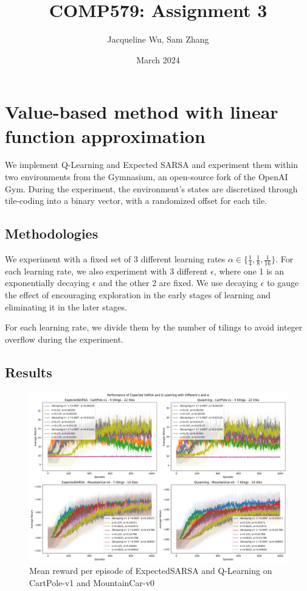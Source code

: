 \documentclass{article}
\title{COMP579: Assignment 3}
\author{Jacqueline Wu, Sam Zhang}
\date{March 2024}
\begin{document}
\maketitle

\section{Value-based method with linear function approximation}
We implement Q-Learning and Expected SARSA and experiment them within two environments from the Gymnasium, an open-source fork of the OpenAI Gym.\cite{gymnasium}
During the experiment, the environment's states are discretized through tile-coding into a binary vector, with a randomized offset for each tile.

\subsection{Methodologies}
We experiment with a fixed set of 3 different learning rates $\alpha \in \{ \frac{1}{4}, \frac{1}{8}, \frac{1}{16} \}$.
For each learning rate, we also experiment with 3 different $\epsilon$, where one 1 is an
exponentially decaying $\epsilon$ and the other 2 are fixed. We use decaying $\epsilon$ to
gauge the effect of encouraging exploration in the early stages of learning
and eliminating it in the later stages.

For each learning rate, we divide them by the number of tilings to avoid integer overflow during
the experiment.

\subsection{Results}

\begin{figure}[htbp]
    \centering
    \includegraphics[scale=0.35]{q1.png}
    \caption{Mean reward per episode of ExpectedSARSA and Q-Learning on CartPole-v1 and MountainCar-v0}
    \label{fig:q1}
\end{figure}
\end{document}
